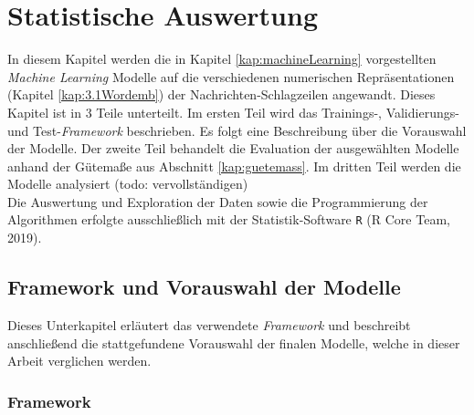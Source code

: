 \documentclass[a4paper,11pt]{article}
\begin{document}
\newpage


\section{Statistische Auswertung}\label{Kap:statAus}

In diesem Kapitel werden die in Kapitel \ref{kap:machineLearning} vorgestellten \textit{Machine Learning} Modelle auf die verschiedenen numerischen Repräsentationen (Kapitel \ref{kap:3.1Wordemb}) der Nachrichten-Schlagzeilen angewandt. Dieses Kapitel ist in $3$ Teile unterteilt. Im ersten Teil wird das Trainings-, Validierungs- und Test-\textit{Framework} beschrieben. Es folgt eine Beschreibung über die Vorauswahl der Modelle. Der zweite Teil behandelt die Evaluation der ausgewählten Modelle anhand der Gütemaße aus Abschnitt \ref{kap:guetemass}. Im dritten Teil werden die Modelle analysiert (todo: vervollständigen)\\
Die Auswertung und Exploration der Daten sowie die Programmierung der Algorithmen erfolgte ausschließlich mit der Statistik-Software \texttt{R} (R Core Team, 2019).

\subsection{Framework und Vorauswahl der Modelle}

Dieses Unterkapitel erläutert das verwendete \textit{Framework} und beschreibt anschließend die stattgefundene Vorauswahl der finalen Modelle, welche in dieser Arbeit verglichen werden.

\subsubsection{Framework}
\end{document}
